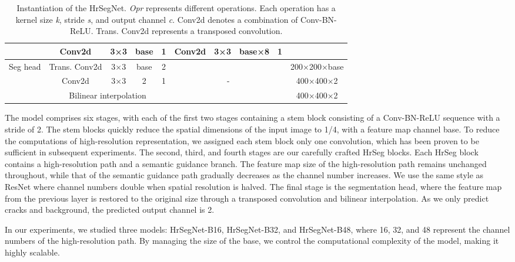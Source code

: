 \documentclass[preprint,12pt,authoryear]{elsarticle}
\begin{document}
\begin{center}
\begin{table}[t]
\begin{tabular}{ c|c c c c|c c c c|c }
& Conv2d & 3×3 & base & 1 &  Conv2d & 3×3 & base×8 & 1 & \\
\hline
\multirow{3}{*}{Seg head} & Trans. Conv2d & 3×3 & base & 2 & \multicolumn{4}{c|}{} & 200×200×base\\
& Conv2d & 3×3 & 2 & 1 & \multicolumn{4}{c|}{-}& 400×400×2\\
& \multicolumn{4}{|c|}{Bilinear interpolation}& \multicolumn{4}{c|}{} & 400×400×2 \\
\bottomrule
\end{tabular}

    \caption{Instantiation of the HrSegNet. \textit{Opr} represents different operations. Each operation has a kernel size \textit{k}, stride \textit{s}, and output channel \textit{c}. Conv2d denotes a combination of Conv-BN-ReLU. Trans. Conv2d represents a transposed convolution. }
    
    \label{tab:table1}
\end{table}
\end{center}

The model comprises six stages, with each of the first two stages containing a stem block consisting of a Conv-BN-ReLU sequence with a stride of 2. The stem blocks quickly reduce the spatial dimensions of the input image to 1/4, with a feature map channel base. To reduce the computations of high-resolution representation, we assigned each stem block only one convolution, which has been proven to be sufficient in subsequent experiments. The second, third, and fourth stages are our carefully crafted HrSeg blocks. Each HrSeg block contains a high-resolution path and a semantic guidance branch. The feature map size of the high-resolution path remains unchanged throughout, while that of the semantic guidance path gradually decreases as the channel number increases. We use the same style as ResNet where channel numbers double when spatial resolution is halved. The final stage is the segmentation head, where the feature map from the previous layer is restored to the original size through a transposed convolution and bilinear interpolation. As we only predict cracks and background, the predicted output channel is 2.


In our experiments, we studied three models: HrSegNet-B16, HrSegNet-B32, and HrSegNet-B48, where 16, 32, and 48 represent the channel numbers of the high-resolution path. By managing the size of the base, we control the computational complexity of the model, making it highly scalable.
\end{document}
